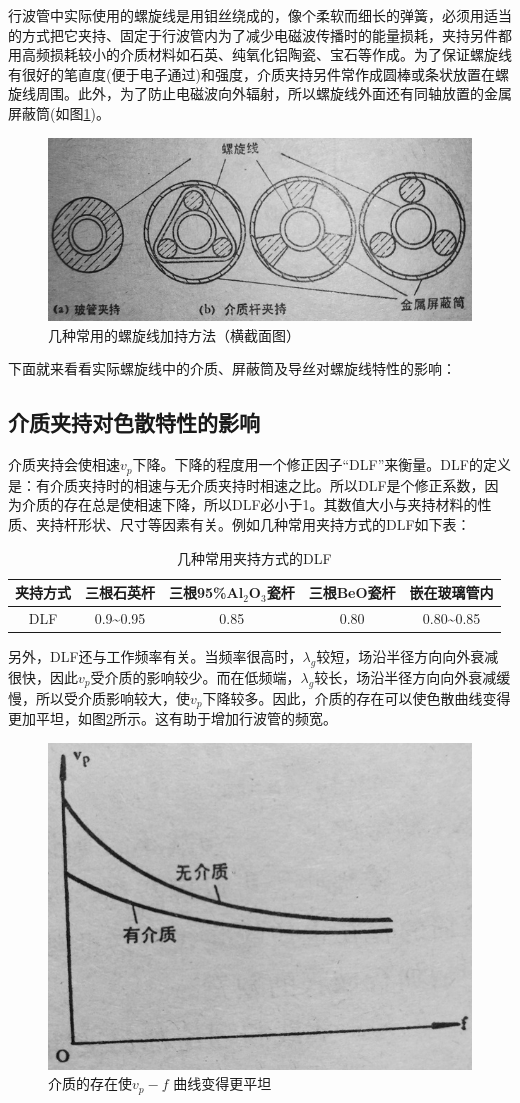 行波管中实际使用的螺旋线是用钼丝绕成的，像个柔软而细长的弹簧，必须用适当的方式把它夹持、固定于行波管内为了减少电磁波传播时的能量损耗，夹持另件都用高频损耗较小的介质材料如石英、纯氧化铝陶瓷、宝石等作成。为了保证螺旋线有很好的笔直度(便于电子通过)和强度，介质夹持另件常作成圆棒或条状放置在螺旋线周围。此外，为了防止电磁波向外辐射，所以螺旋线外面还有同轴放置的金属屏蔽筒(如图\ref{ch3-9})。
\begin{figure}[phtb]
	\centering
	\includegraphics[width=0.65\linewidth]{figure/ch3-9}
	\caption{几种常用的螺旋线加持方法（横截面图）}
	\label{ch3-9}
\end{figure}

下面就来看看实际螺旋线中的介质、屏蔽筒及导丝对螺旋线特性的影响：
\subsection{介质夹持对色散特性的影响}
介质夹持会使相速$ v_p $下降。下降的程度用一个修正因子“DLF”来衡量。DLF的定义是：有介质夹持时的相速与无介质夹持时相速之比。所以DLF是个修正系数，因为介质的存在总是使相速下降，所以DLF必小于1。其数值大小与夹持材料的性质、夹持杆形状、尺寸等因素有关。例如几种常用夹持方式的DLF如下表：
\begin{table} 
	\caption{几种常用夹持方式的DLF}\label{tab:3-1}
	\begin{tabular}{ccccc}
		\toprule
		\centering 
		夹持方式 & 三根石英杆                  & 三根95\%Al$ _2 $O$ _3 $瓷杆 & 三根BeO瓷杆 & 嵌在玻璃管内                    \\ \midrule
		DLF                & 0.9\textasciitilde 0.95 & 0.85                    & 0.80    & 0.80\textasciitilde 0.85 \\ \bottomrule
	\end{tabular}
\end{table}


 另外，DLF还与工作频率有关。当频率很高时，$ \lambda_g $较短，场沿半径方向向外衰减很快，因此$ v_p $受介质的影响较少。而在低频端，$ \lambda_g $较长，场沿半径方向向外衰减缓慢，所以受介质影响较大，使$ v_p $下降较多。因此，介质的存在可以使色散曲线变得更加平坦，如图\ref{ch3-10}所示。这有助于增加行波管的频宽。
 \begin{figure}[phtb]
 	\centering
 	\includegraphics[width=0.45\linewidth]{figure/ch3-10}
 	\caption{介质的存在使$ v_p-f $ 曲线变得更平坦}
 	\label{ch3-10}
 \end{figure}

